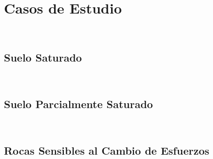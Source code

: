 %





\chapter{Casos de Estudio}~\hypertarget{ch:chapter_10}{}
\label{ch:chapter_10}
 
 \lipsum[1-2]
 

\section{Suelo Saturado}~\hypertarget{sec:sec1010}{}
\label{sec:sec1010}




\section{Suelo Parcialmente Saturado}~\hypertarget{sec:sec1020}{}
\label{sec:sec1020}



\section{Rocas Sensibles al Cambio de Esfuerzos}~\hypertarget{sec:sec1030}{}
\label{sec:sec1030}


